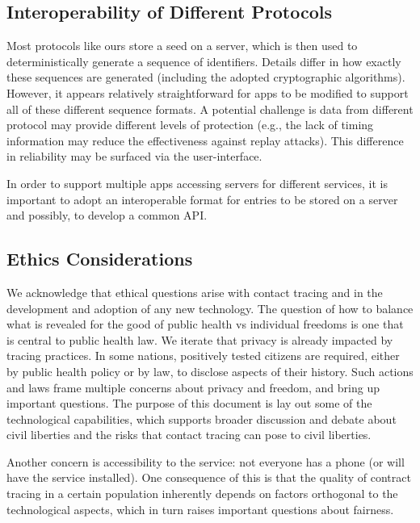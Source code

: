 \subsection{Interoperability of Different Protocols}

Most protocols like ours store a seed on a server, which is then used to deterministically generate a sequence of identifiers. Details differ in how exactly these sequences are generated (including the adopted cryptographic algorithms).  However, it appears relatively straightforward for apps to be modified to support all of these different sequence formats. A potential challenge is data from different protocol may provide different levels of protection (e.g., the lack of timing information may reduce the effectiveness against replay attacks). This difference in reliability may be surfaced via the user-interface.

In order to support multiple apps accessing servers for different services, it is important to adopt an interoperable format for entries to be stored on a server and possibly, to develop a common API.

\subsection{Ethics Considerations}
We acknowledge that ethical questions arise with contact tracing and in the development and adoption of any new technology. The question of how to balance what is revealed for the good of public health vs individual freedoms is one that is central to public health law. We iterate that privacy is already impacted by tracing practices. In some nations, positively tested citizens are required, either by public health policy or by law, 
to disclose aspects of their history. Such actions and laws frame multiple concerns about privacy and freedom, and bring up important questions.  The purpose of this document is lay out some of the technological capabilities, which supports broader discussion and debate about civil liberties and the risks that contact tracing can pose to civil liberties.

Another concern is accessibility to the service: not everyone has a phone (or will have the service installed). One consequence of this is that the quality of contract tracing in a certain population inherently depends on factors orthogonal to the technological aspects, which in turn raises important questions about fairness.

